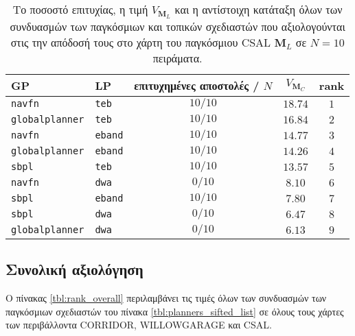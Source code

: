 \begin{table}[htb]\centering
\renewcommand{\arraystretch}{1.3}
\begin{tabular}{llccc}
  GP & LP & επιτυχημένες αποστολές / $N$ & $V_{\bm{M}_C}$ & rank \\ \toprule
  \texttt{navfn} & \texttt{teb} & $10/10$ & $18.74$ & $1$ \\
  \texttt{globalplanner} & \texttt{teb} & $10/10$ & $16.84$ & $2$ \\
  \texttt{navfn} & \texttt{eband} & $10/10$ & $14.77$ & $3$ \\
  \texttt{globalplanner} & \texttt{eband} & $10/10$ & $14.26$ & $4$ \\
  \texttt{sbpl} & \texttt{teb} & $10/10$ & $13.57$ & $5$ \\
  \texttt{navfn} & \texttt{dwa} & $0/10$ & $8.10$ & $6$ \\
  \texttt{sbpl} & \texttt{eband} & $10/10$ & $7.80$ & $7$ \\
  \texttt{sbpl} & \texttt{dwa} & $0/10$ & $6.47$ & $8$ \\
  \texttt{globalplanner} & \texttt{dwa} & $0/10$ & $6.13$ & $9$ \\ \bottomrule
\end{tabular}
\caption{Το ποσοστό επιτυχίας, η τιμή $V_{\bm{M}_L}$ και η αντίστοιχη κατάταξη όλων των
         συνδυασμών των παγκόσμιων και τοπικών σχεδιαστών που αξιολογούνται στις
         την απόδοσή τους στο χάρτη του παγκόσμιου CSAL $\bm{M}_L$ σε $N=10$
         πειράματα.}
\label{tbl:rank_csal}
\end{table}


\subsection{Συνολική αξιολόγηση}
  \label{subsection:02_01_04:05}

Ο πίνακας \ref{tbl:rank_overall} περιλαμβάνει τις τιμές όλων των συνδυασμών των παγκόσμιων
σχεδιαστών του πίνακα \ref{tbl:planners_sifted_list} σε όλους τους χάρτες των
περιβάλλοντα CORRIDOR, WILLOWGARAGE και CSAL.

